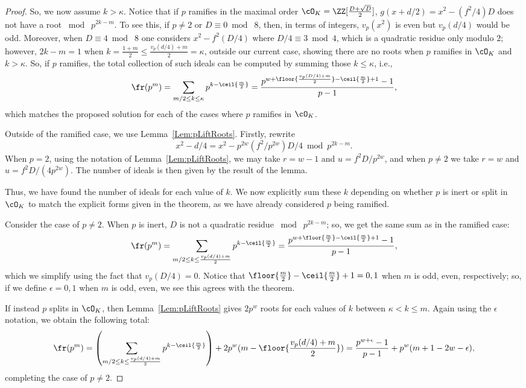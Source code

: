 \documentclass[11pt, proquest]{uwthesis}
\begin{document}
\begin{proof}
  So, we now assume $k>\kappa$.
  Notice that if $p$ ramifies in the maximal order $\cO_K = \ZZ[\frac{D+\sqrt{D}}{2}]$, $g(x+d/2)=x^2-(f^2/4)D$ does not have a root $\bmod\; p^{2k-m}$.
  To see this, if $p\ne 2$ or $D\equiv 0\bmod\; 8$, then, in terms of integers, $v_p(x^2)$ is even but $v_p(d/4)$ would be odd. Moreover, when $D\equiv 4\bmod\; 8$ one considers $x^2 - f^2(D/4)$ where $D/4\equiv 3\bmod 4$, which is a quadratic residue only modulo $2$; however, $2k-m=1$ when $k = \frac{1+m}{2}\leq \frac{v_p(d/4)+m}{2}=\kappa$, outside our current case, showing there are no roots when $p$ ramifies in $\cO_K$ and $k>\kappa$.
  So, if $p$ ramifies, the total collection of such ideals can be computed by summing those $k \leq \kappa$, i.e.,
  \[
  \fr(p^m) =\sum_{m/2\leq k\leq \kappa} p^{k-\ceil{\frac{m}{2}}} = \frac{p^{w+\floor{\frac{v_p(D/4)+m}{2}}-\ceil{\frac{m}{2}}+1}-1}{p-1},
  \]
  which matches the proposed solution for each of the cases where $p$ ramifies in $\cO_K$.

  Outside of the ramified case, we use Lemma~\ref{Lem:pLiftRoots}.
  Firstly, rewrite
  \[
  x^2 - d/4 = x^2-p^{2w}(f^2/p^{2w})D/4\bmod p^{2k-m}.
  \]
  When $p=2$, using the notation of Lemma~\ref{Lem:pLiftRoots}, we may take $r=w-1$ and $u=f^2D/p^{2w}$, and when $p\ne 2$ we take $r=w$ and $u=f^2D/(4p^{2w})$.
  The number of ideals is then given by the result of the lemma.

Thus, we have found the number of ideals for each value of $k$.
We now explicitly sum these $k$ depending on whether $p$ is inert or split in $\cO_K$ to match the explicit forms given in the theorem, as we have already considered $p$ being ramified.

  Consider the case of $p\ne 2$. When $p$ is inert, $D$ is not a quadratic residue $\bmod\; p^{2k-m}$; so, we get the same sum as in the ramified case:
  \[
  \fr(p^m) =\sum_{m/2\leq k\leq \frac{v_p(d/4)+m}{2}} p^{k-\ceil{\frac{m}{2}}} = \frac{p^{w+\floor{\frac{m}{2}}-\ceil{\frac{m}{2}}+1}-1}{p-1},
  \]
  which we simplify using the fact that $v_p(D/4) = 0$.
  Notice that $\floor{\frac{m}{2}}-\ceil{\frac{m}{2}} + 1 = 0,1$ when $m$ is odd, even, respectively; so, if we define $\epsilon = 0,1$ when $m$ is odd, even, we see this agrees with the theorem.

  If instead $p$ splits in $\cO_K$, then Lemma~\ref{Lem:pLiftRoots} gives $2p^w$ roots for each values of $k$ between $\kappa < k\leq m$.
  Again using the $\epsilon$ notation, we obtain the following total:
  \[
  \fr(p^m) =\left(\sum_{m/2\leq k\leq \frac{v_p(d/4)+m}{2}} p^{k-\ceil{\frac{m}{2}}}\right) + 2p^w(m-\floor{\frac{v_p(d/4)+m}{2}}) = \frac{p^{w+\epsilon}-1}{p-1} + p^w(m+1 - 2w-\epsilon),
  \]
  completing the case of $p\ne 2$.


\end{proof}
\end{document}
